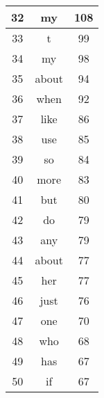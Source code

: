 \begin{table}
\begin{center}
\begin{tabular}{ c | c | c }
32 & my & 108 \\ \hline
33 & t &  99 \\ \hline
34 & my & 98 \\ \hline
35 & about & 94 \\ \hline
36 & when &  92 \\ \hline
37 & like & 86 \\ \hline
38 & use & 85 \\ \hline
39 & so & 84 \\ \hline
40 & more & 83 \\ \hline
41 & but & 80\\ \hline
42 & do & 79 \\ \hline
43 & any & 79 \\ \hline
44 & about & 77 \\ \hline
45 & her & 77 \\ \hline
46 & just & 76 \\ \hline
47 & one& 70 \\ \hline
48 & who & 68 \\ \hline
49 & has & 67 \\ \hline
50 & if &  67 \\
    \hline
  \end{tabular}
  \label{table:textFiles}
\end{center}
\end{table} 

